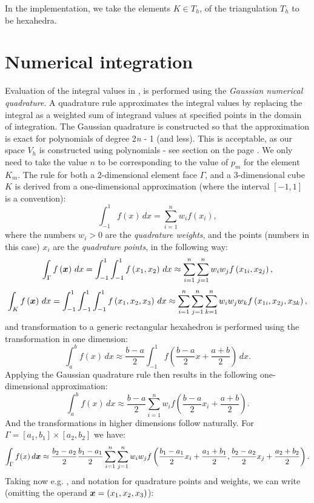 In the implementation, we take the elements $K \in T_h$, of the triangulation $T_h$ to be hexahedra.
\section{Numerical integration}
Evaluation of the integral values in ,  is performed using the \textit{Gaussian numerical quadrature}. A quadrature rule approximates the integral values by replacing the integral as a weighted sum of integrand values at specified points in the domain of integration. The Gaussian quadrature is constructed so that the approximation is exact for polynomials of degree 2\textit{n} - 1 (and less). This is acceptable, as our space $V_h$ is constructed using polynomials - see section  on the page \pageref{section:Vh}. We only need to take the value $n$ to be corresponding to the value of $p_m$ for the element $K_m$. The rule for both a 2-dimensional element face $\Gamma$, and a 3-dimensional cube $K$ is derived from a one-dimensional approximation (where the interval $\left[-1, 1\right]$ is a convention):
$$
\int_{-1}^1 f(x)\,dx = \sum_{i=1}^n w_i f(x_i),
$$
where the numbers $w_i > 0$ are the \textit{quadrature weights}, and the points (numbers in this case) $x_i$ are the \textit{quadrature points}, in the following way:
$$
\int_{\Gamma} f\left(\mbox{\boldmath $x$}\right)\,dx = \int_{-1}^{1}\int_{-1}^{1} f\left( x_1, x_2\right)\,dx \approx \sum_{i=1}^n\sum_{j=1}^n w_i w_j f\left( x_{1i}, x_{2j}\right),
$$
$$
\int_{K} f\left(\mbox{\boldmath $x$}\right)\,dx = \int_{-1}^{1}\int_{-1}^{1}\int_{-1}^{1} f\left( x_1, x_2, x_3\right)\,dx \approx \sum_{i=1}^n\sum_{j=1}^n\sum_{k=1}^n w_i w_j w_k f\left( x_{1i}, x_{2j}, x_{3k}\right),
$$
and transformation to a generic rectangular hexahedron is performed using the transformation in one dimension:
$$
\int_a^b f(x)\,dx \approx \frac{b-a}{2} \int_{-1}^1 f\left(\frac{b-a}{2}x + \frac{a+b}{2}\right)\,dx.
$$
Applying the Gaussian quadrature rule then results in the following one-dimensional approximation:
$$
\int_a^b f(x)\,dx \approx \frac{b-a}{2} \sum_{i=1}^n w_i f\left(\frac{b-a}{2}x_i + \frac{a+b}{2}\right).
$$
And the transformations in higher dimensions follow naturally. For $\Gamma = \left[a_1, b_1\right] \times \left[a_2, b_2\right]$ we have:
$$
\int_{\Gamma} f(x)\,d\mbox{\boldmath $x$} \approx \frac{b_2-a_2}{2}\frac{b_1-a_1}{2} \sum_{i=1}^n \sum_{j=1}^n w_i w_j f\left(\frac{b_1-a_1}{2}x_i + \frac{a_1+b_1}{2},\frac{b_2-a_2}{2}x_j + \frac{a_2+b_2}{2}\right).
$$
Taking now e.g. , and notation for quadrature points and weights, we can write (omitting the operand $\mbox{\boldmath $x$} = \left( x_1, x_2, x_3\right)$):
